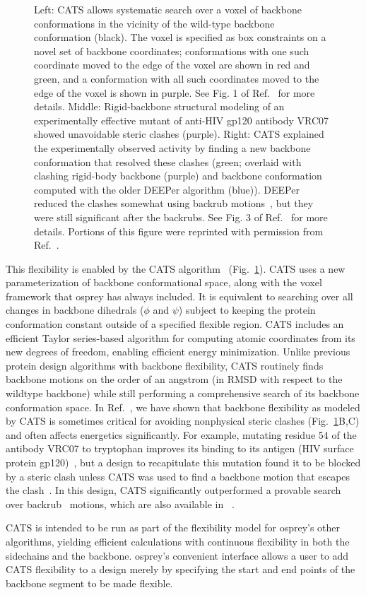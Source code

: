 \begin{figure}
\caption{Left: CATS allows systematic search over a voxel of backbone conformations in the vicinity of the wild-type backbone conformation (black).  The voxel is specified as box constraints on a novel set of backbone coordinates; conformations with one such coordinate moved to the edge of the voxel are shown in red and green, and a conformation with all such coordinates moved to the edge of the voxel is shown in purple.  See Fig. 1 of Ref.~ for more details.  Middle: Rigid-backbone structural modeling of an experimentally effective mutant of anti-HIV gp120 antibody VRC07 showed unavoidable steric clashes (purple).  Right: CATS explained the experimentally observed activity by finding a new backbone conformation that resolved these clashes (green; overlaid with clashing rigid-body backbone (purple) and backbone conformation computed with the older DEEPer algorithm (blue)).  DEEPer reduced the clashes somewhat using backrub motions~\cite{backrub}, but they were still significant after the backrubs.  See Fig. 3 of Ref.~ for more details.   Portions of this figure were reprinted with permission from Ref.~.  }
\label{fig:cats}
\end{figure}

This flexibility is enabled by the CATS algorithm~\cite{CATS} (Fig.~\ref{fig:cats}).  CATS uses a new parameterization of backbone conformational space, along with the voxel framework that {\sc osprey} has always included.  It is equivalent to searching over all changes in backbone dihedrals ($\phi$ and $\psi$) subject to keeping the protein conformation constant outside of a specified flexible region. CATS includes an efficient Taylor series-based algorithm for computing atomic coordinates from its new degrees of freedom, enabling efficient energy minimization.  Unlike previous protein design algorithms with backbone flexibility, CATS routinely finds backbone motions on the order of an angstrom (in RMSD with respect to the wildtype backbone) while still performing a comprehensive search of its backbone conformation space.  In Ref.~, we have shown that backbone flexibility as modeled by CATS is sometimes critical for avoiding nonphysical steric clashes (Fig.~\ref{fig:cats}B,C) and often affects energetics significantly.  For example, mutating residue 54 of the antibody VRC07 to tryptophan improves its binding to its antigen (HIV surface protein gp120)~\cite{VRC07_enhance}, but a design to recapitulate this mutation found it to be blocked by a steric clash unless CATS was used to find a backbone motion that escapes the clash~\cite{CATS}.  In this design, CATS significantly outperformed a provable search over backrub~\cite{backrub} motions, which are also available in \osprey~\cite{BRDEE,DEEPer}.  

CATS is intended to be run as part of the flexibility model for {\sc osprey}'s other algorithms, yielding efficient calculations with continuous flexibility in both the sidechains and the backbone. {\sc osprey}'s convenient interface allows a user to add CATS flexibility to a design merely by specifying the start and end points of the backbone segment to be made flexible.  

